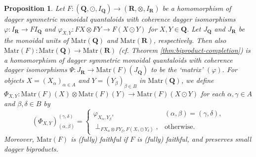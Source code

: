 \documentclass[12pt]{tac}
\newtheorem{proposition}[theorem]{Proposition}
\theoremstyle{definition}
\theoremstyle{remark}
\newcommand{\<}{\langle}
\renewcommand{\>}{\rangle}
\renewcommand{\:}{\colon}
\begin{document}
\begin{proposition}\label{prop:Matr-homomorphism-of-dagger-symmetric-monoidal-quantaloids}
    Let $F:(\mathbf Q,\odot,I_{\mathbf Q})\to(\mathbf R,\otimes,I_{\mathbf R})$ be a homomorphism of dagger symmetric monoidal quantaloids with coherence dagger isomorphisms $\varphi:I_\mathbf R\to FI_{\mathbf Q}$ and $\varphi_{X,Y}:FX\otimes FY\to F(X\odot Y)$ for  $X,Y\in\mathbf Q$. Let $J_\mathbf Q$ and $J_{\mathbf R}$ be the monoidal units of $\mathrm{Matr}(\mathbf Q)$ and $\mathrm{Matr}(\mathbf R)$, respectively. Then also $\mathrm{Matr}(F):\mathrm{Matr}(\mathbf Q)\to\mathrm{Matr}(\mathbf R)$ (cf. Theorem  \ref{thm:biproduct-completion}) is a homomorphism of dagger symmetric monoidal quantaloids with coherence dagger isomorphisms 
    $\Psi:J_{\mathbf R}\to \mathrm{Matr}(F)(J_{\mathbf Q})$ to be the `matrix' $(\varphi)$. For objects $X=(X_\alpha)_{\alpha\in A}$ and $Y=(Y_\beta)_{\beta\in B}$ in $\mathrm{Matr}(\mathbf Q)$, we define $\Phi_{X,Y}:\mathrm{Matr}(F)(X)\otimes\mathrm{Matr}(F)(Y)\to\mathrm{Matr}(F)(X\odot Y)$ for each $\alpha,\gamma\in A$ and $\beta,\delta\in B$ by
    \[ (\Phi_{X,Y})_{(\alpha,\beta)}^{(\gamma,\delta)}=\begin{cases} \varphi_{X_\alpha,Y_\beta}, & (\alpha,\beta)=(\gamma,\delta),\\
    \perp_{FX_\alpha\otimes FY_{\beta},F(X_\gamma\odot Y_\delta)}, & \text{otherwise}.\end{cases}\]
     Moreover, $\mathrm{Matr}(F)$ is (fully) faithful if $F$ is (fully) faithful, and preserves small dagger biproducts. 
\end{proposition}
\end{document}
